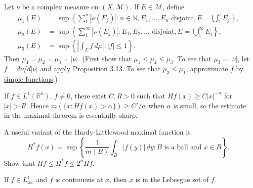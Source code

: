 	\begin{exercise}[Folland 3.21]
		Let $\nu$ be a complex measure on $(X, \mathcal{M})$. If $E \in \mathcal{M}$, define
		\begin{align}
			\mu_1(E) &= \sup\left\{\sum_1^n |\nu(E_j)| : n \in \mathbb{N}, E_1, \dots, E_n \text{ disjoint}, E = \bigcup_1^n E_j\right\}, \\
			\mu_2(E) &= \sup\left\{\sum_1^\infty |\nu(E_j)| : E_1, E_2, \dots \text{ disjoint}, E = \bigcup_1^\infty E_j\right\}, \\
			\mu_3(E) &= \sup\left\{\left|\int_E f \, d\mu\right| : |f| \le 1\right\}.
		\end{align}
		Then $\mu_1 = \mu_2 = \mu_3 = |\nu|$. (First show that $\mu_1 \le \mu_2 \le \mu_3$. To see that $\mu_3 = |\nu|$, let $f = \overline{d\nu/d|\nu|}$ and apply Proposition 3.13. To see that $\mu_3 \le \mu_1$, approximate $f$ by \hyperref[def:simple-functions]{simple functions}.)
	\end{exercise}
	\begin{solution}

	\end{solution}

	\begin{exercise}[Folland 3.22]
		If $f \in L^1(\mathbb{R}^n)$, $f \neq 0$, there exist $C, R > 0$ such that $Hf(x) \ge C|x|^{-n}$ for $|x| > R$. Hence $m(\{x : Hf(x) > \alpha\}) \ge C'/\alpha$ when $\alpha$ is small, so the estimate in the maximal theorem is essentially sharp.
	\end{exercise}
	\begin{solution}

	\end{solution}

	\begin{exercise}[Folland 3.23]
		A useful variant of the Hardy-Littlewood maximal function is
		\begin{equation}
			H^*f(x) = \sup\left\{\frac{1}{m(B)} \int_B |f(y)| \, dy : B \text{ is a ball and } x \in B\right\}.
		\end{equation}
		Show that $Hf \le H^*f \le 2^n Hf$.
	\end{exercise}
	\begin{solution}

	\end{solution}

	\begin{exercise}[Folland 3.24]
		If $f \in L_{\text{loc}}^1$ and $f$ is continuous at $x$, then $x$ is in the Lebesgue set of $f$.
	\end{exercise}
	\begin{solution}

	\end{solution}

